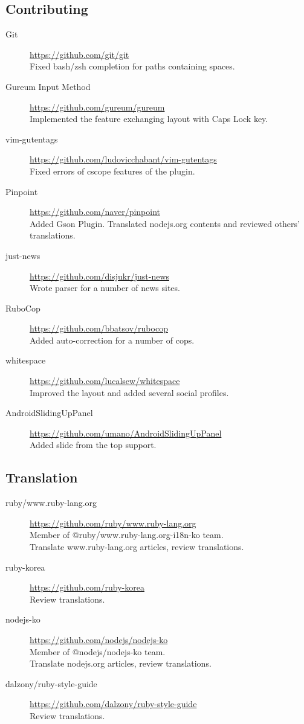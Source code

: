 \documentclass[a4paper,10pt]{article}
\begin{document}
\subsection{Contributing}
\begin{description}
  \item[Git] \url{https://github.com/git/git} \\
    Fixed bash/zsh completion for paths containing spaces.
  \item[Gureum Input Method] \url{https://github.com/gureum/gureum} \\
    Implemented the feature exchanging layout with Caps Lock key.
  \item[vim-gutentags] \url{https://github.com/ludovicchabant/vim-gutentags} \\
    Fixed errors of cscope features of the plugin.
  \item[Pinpoint] \url{https://github.com/naver/pinpoint} \\
    Added Gson Plugin.
    Translated nodejs.org contents and reviewed others' translations.
  \item[just-news] \url{https://github.com/disjukr/just-news} \\
    Wrote parser for a number of news sites.
  \item[RuboCop] \url{https://github.com/bbatsov/rubocop} \\
    Added auto-correction for a number of cops.
  \item[whitespace] \url{https://github.com/lucalsew/whitespace} \\
    Improved the layout and added several social profiles.
  \item[AndroidSlidingUpPanel] \url{https://github.com/umano/AndroidSlidingUpPanel} \\
    Added slide from the top support.
\end{description}

\subsection{Translation}
\begin{description}
  \item[ruby/www.ruby-lang.org] \url{https://github.com/ruby/www.ruby-lang.org} \\
    Member of @ruby/www.ruby-lang.org-i18n-ko team. \\
    Translate www.ruby-lang.org articles, review translations.
  \item[ruby-korea] \url{https://github.com/ruby-korea} \\
    Review translations.
  \item[nodejs-ko] \url{https://github.com/nodejs/nodejs-ko} \\
    Member of @nodejs/nodejs-ko team. \\
    Translate nodejs.org articles, review translations.
  \item[dalzony/ruby-style-guide] \url{https://github.com/dalzony/ruby-style-guide} \\
    Review translations.
\end{description}


\end{document}
